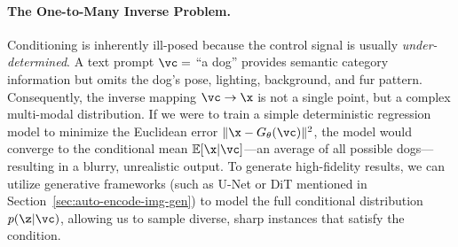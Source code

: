 \documentclass[../../book-main.tex]{subfiles}
\begin{document}
\paragraph{The One-to-Many Inverse Problem.}
Conditioning is inherently ill-posed because the control signal is
usually \textit{under-determined}. A text prompt $\vc=$ ``a dog''
provides semantic category information but omits the dog's pose,
lighting, background, and fur pattern. Consequently, the inverse
mapping $\vc \to \x$ is not a single point, but a complex multi-modal
distribution. If we were to train a simple deterministic regression
model to minimize the Euclidean error $\|\x - G_\theta(\vc)\|^2$, the
model would converge to the conditional mean $\mathbb{E}[\x|\vc]$—an
average of all possible dogs—resulting in a blurry, unrealistic
output. To generate high-fidelity results, we can utilize generative
frameworks (such as U-Net or DiT mentioned in
Section~\ref{sec:auto-encode-img-gen}) to model the full conditional
distribution $p(\z|\vc)$, allowing us to sample diverse, sharp
instances that satisfy the condition.



\end{document}
